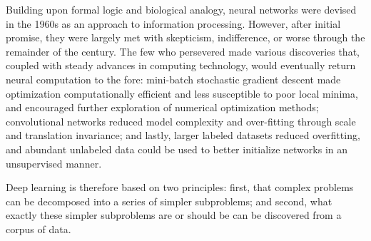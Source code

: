 Building upon formal logic and biological analogy, neural networks were devised in the 1960s as an approach to information processing.
However, after initial promise, they were largely met with skepticism, indifference, or worse through the remainder of the century.
The few who persevered made various discoveries that, coupled with steady advances in computing technology, would eventually return neural computation to the fore:
mini-batch stochastic gradient descent made optimization computationally efficient and less susceptible to poor local minima, and encouraged further exploration of numerical optimization methods;
convolutional networks reduced model complexity and over-fitting through scale and translation invariance;
and lastly, larger labeled datasets reduced overfitting, and abundant unlabeled data could be used to better initialize networks in an unsupervised manner.

Deep learning is therefore based on two principles: first, that complex problems can be decomposed into a series of simpler subproblems; and second, what exactly these simpler subproblems are or should be can be discovered from a corpus of data.
